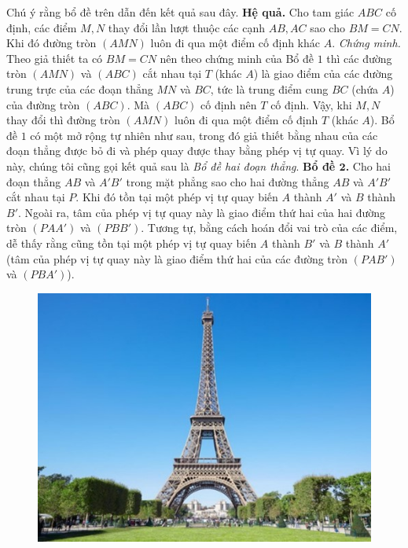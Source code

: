 \begin{multicols}{2}
\begin{figure}[H]
		\vspace*{-5pt}
	\end{figure}
	Chú ý rằng bổ đề trên dẫn đến kết quả sau đây.
	\vskip 0.1cm
	\textbf{\color{diendantoanhoc}Hệ quả.} Cho tam giác $ABC$ cố định, các điểm $M,N$ thay đổi lần lượt thuộc các cạnh $AB,AC$ sao cho $BM=CN$. Khi đó đường tròn $(AMN)$ luôn đi qua một điểm cố định khác $A$.
	\vskip 0.1cm
	\textit{Chứng minh.} Theo giả thiết ta có $BM=CN$ nên theo chứng minh của Bổ đề $1$ thì các đường tròn $(AMN)$ và $(ABC)$ cắt nhau tại $T$ (khác $A$) là giao điểm của các đường trung trực của các đoạn thẳng $MN$ và $BC$, tức là trung điểm cung $BC$ (chứa $A$) của đường tròn $(ABC)$. Mà $(ABC)$ cố định nên $T$ cố định. Vậy,  khi $M,N$ thay đổi thì đường tròn $(AMN)$ luôn đi qua một điểm cố định $T$ (khác $A$).	\vskip 0.1cm
	\vskip 0.1cm
	Bổ đề $1$ có một mở rộng tự nhiên như sau, trong đó giả thiết bằng nhau của các đoạn thẳng được bỏ đi và phép quay được thay bằng phép vị tự quay. Vì lý do này, chúng tôi cũng gọi kết quả sau là \textit{Bổ đề hai đoạn thẳng}.
	\vskip 0.1cm
	\textbf{\color{diendantoanhoc}Bổ đề $\pmb{2}$.} Cho hai đoạn thẳng $AB$ và $A'B'$ trong mặt phẳng sao cho hai đường thẳng $AB$ và $A'B'$ cắt nhau tại $P$. Khi đó tồn tại một phép vị tự quay biến $A$ thành $A'$ và $B$ thành $B'$. Ngoài ra, tâm của phép vị tự quay này là giao điểm thứ hai của hai đường tròn $(PAA')$ và $(PBB')$.
	\vskip 0.1cm
	Tương tự, bằng cách hoán đổi vai trò của các điểm, dễ thấy rằng cũng tồn tại một phép vị tự quay biến $A$ thành $B'$ và $B$ thành $A'$ (tâm của phép vị tự quay này là giao điểm thứ hai của các đường tròn $(PAB')$ và $(PBA')$).
	\begin{figure}[H]
		\vspace*{-5pt}
		\centering
		\captionsetup{labelformat= empty, justification=centering}
		\includegraphics[width=1\linewidth]{2}

\end{figure}
\end{multicols}

